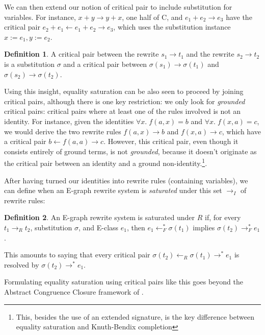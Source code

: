 \documentclass[12pt,a4paper,twoside,openright]{report}
\numberwithin{equation}{chapter}		%
\numberwithin{figure}{chapter}			%
\numberwithin{table}{chapter}			%
\theoremstyle{definition}
\newtheorem*{definition}{Definition}
\theoremstyle{plain}
\begin{document}
We can then extend our notion of critical pair to include substitution for variables. For instance, $x + y \rightarrow y + x$, one half of C, and $e_1 + e_2 \rightarrow e_3$ have the critical pair $e_2 + e_1 \leftarrow e_1 + e_2 \rightarrow e_3$, which uses the substitution instance $x := e_1, y := e_2$.

\begin{definition}
	A critical pair between the rewrite $s_1 \rightarrow t_1$ and the rewrite $s_2 \rightarrow t_2$ is a substitution $\sigma$ and a critical pair between $\sigma(s_1) \rightarrow \sigma(t_1)$ and $\sigma(s_2) \rightarrow \sigma(t_2)$.
\end{definition}

Using this insight, equality saturation can be also seen to proceed by joining critical pairs, although there is one key restriction: we only look for \emph{grounded} critical pairs: critical pairs where at least one of the rules involved is not an identity. For instance, given the identities $\forall x.\; f(a, x) = b$ and $\forall x.\; f(x, a) = c$, we would derive the two rewrite rules $f(a, x) \rightarrow b$ and $f(x, a) \rightarrow c$, which have a critical pair $b \leftarrow f(a, a) \rightarrow c$. However, this critical pair, even though it consists entirely of ground terms, is not \emph{grounded}, because it doesn't originate as the critical pair between an identity and a ground non-identity.\footnote{This, besides the use of an extended signature, is the key difference between equality saturation and Knuth-Bendix completion}.

After having turned our identities into rewrite rules (containing variables), we can define when an E-graph rewrite system is \emph{saturated} under this set $\rightarrow_I$ of rewrite rules:

\begin{definition}
	An E-graph rewrite system is saturated under $R$ if, for every $t_1 \rightarrow_R t_2$, substitution $\sigma$, and E-class $e_1$, then $e_1 \leftarrow^*_F \sigma(t_1)$ implies $\sigma(t_2) \rightarrow^*_F e_1$.
\end{definition}

This amounts to saying that every critical pair $\sigma(t_2) \leftarrow_R \sigma(t_1) \rightarrow^* e_1$ is resolved by $\sigma(t_2) \rightarrow^* e_1$.

Formulating equality saturation using critical pairs like this goes beyond the Abstract Congruence Closure framework of \cite{bachmair_abstract_2000}.
\end{document}
